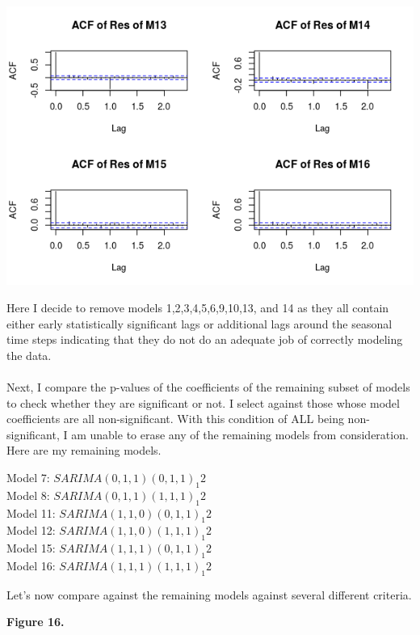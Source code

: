 \documentclass[11pt]{article}
\begin{document}
\begin{center}
\includegraphics[scale=1]{sar4}
\end{center}
Here I decide to remove models 1,2,3,4,5,6,9,10,13, and 14 as they all contain either early statistically significant lags or additional lags around the seasonal time steps indicating that they do not do an adequate job of correctly modeling the data.
\\\\
Next, I compare the p-values of the coefficients of the remaining subset of models to check whether they are significant or not. I select against those whose model coefficients are all non-significant. With this condition of ALL being non-significant, I am unable to erase any of the remaining models from consideration. Here are my remaining models.
\begin{center}
Model 7: $SARIMA(0,1,1)(0,1,1)_1 2$ \\
Model 8: $SARIMA(0,1,1)(1,1,1)_1 2$ \\
Model 11: $SARIMA(1,1,0)(0,1,1)_1 2$ \\
Model 12: $SARIMA(1,1,0)(1,1,1)_1 2$ \\
Model 15: $SARIMA(1,1,1)(0,1,1)_1 2$ \\
Model 16: $SARIMA(1,1,1)(1,1,1)_1 2$ 
\end{center}
Let's now compare against the remaining models against several different criteria.
\begin{center}
\textbf{Figure 16.}
\end{center}
\end{document}
